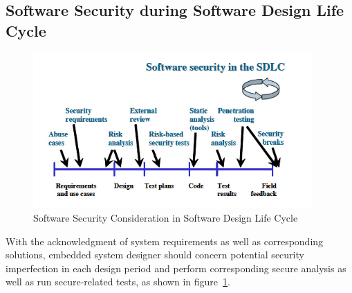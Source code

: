 \subsection{Software Security during Software Design Life Cycle}
\begin{figure}[!htbp]
	\centering
	\includegraphics[width=0.95\textwidth]{sdlc.jpg}
		\caption{Software Security Consideration in Software  Design Life  Cycle\cite{embedded_secure}}
	\label{fig:sdlc}
\end{figure}
With the acknowledgment of system requirements as well as corresponding solutions, embedded system designer should concern potential security imperfection in each design period and perform corresponding secure analysis as well as run secure-related tests, as shown in figure~\ref{fig:sdlc}.
